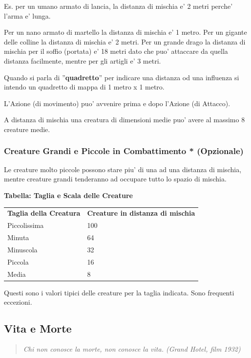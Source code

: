 \documentclass[a4paper,11pt,twoside,openany]{book}
\begin{document}
	Es. per un umano armato di lancia, la distanza di mischia e' 2 metri perche' l'arma e' lunga.
	
	Per un nano armato di martello la distanza di mischia e' 1 metro. Per un gigante delle colline la distanza di mischia e' 2 metri. Per un grande drago la distanza di mischia per il soffio (portata) e' 18 metri dato che puo' attaccare da quella distanza facilmente, mentre per gli artigli e' 3 metri.
	
	Quando si parla di ''\textbf{quadretto}'' per indicare una distanza od una influenza si intendo un quadretto di mappa di 1 metro x 1 metro.
	
	L'Azione (di movimento) puo' avvenire prima e dopo l'Azione (di Attacco).
	
	A distanza di mischia una creatura di dimensioni medie puo' avere al massimo 8 creature medie.
	
	
	\subsubsection{Creature Grandi e Piccole in Combattimento {*} (Opzionale)}
	
	\label{creature-grandi-e-piccole-in-combattimento-opzionale}
	
	Le creature molto piccole possono stare piu' di una ad una distanza di mischia, mentre creature grandi tenderanno ad occupare tutto lo spazio di mischia.
	
	\medskip
	
	\textbf{Tabella: Taglia e Scala delle Creature}
	
	\medskip
	\begin{tabular}{ll}
		\toprule 
		\textbf{Taglia della Creatura} & \textbf{Creature in distanza di mischia}\tabularnewline
		Piccolissima & 100\tabularnewline
		Minuta & 64\tabularnewline
		Minuscola & 32\tabularnewline
		Piccola & 16\tabularnewline
		Media & 8\tabularnewline	
	\end{tabular}
	
	\smallskip
	Questi sono i valori tipici delle creature per la taglia indicata.
	Sono frequenti eccezioni.
	\bigskip
	
	\pagebreak
	
	\subsection{Vita e Morte}
	
	\label{vita-e-morte}
	\begin{quote}\textit{Chi non conosce la morte, non conosce la vita. (Grand Hotel, film 1932)
	}\end{quote}
	
\end{document}
